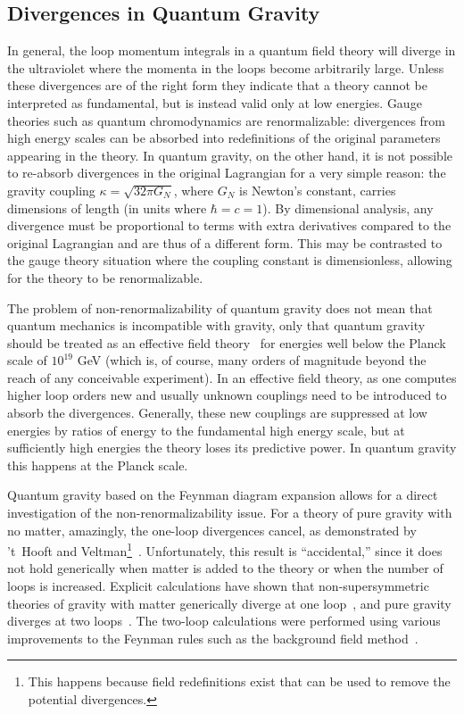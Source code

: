 \documentclass[12pt]{livrev}
\begin{document}
\subsection{Divergences in Quantum Gravity}

In general, the loop momentum integrals in a quantum field theory will
diverge in the ultraviolet where the momenta in the loops become
arbitrarily large.  Unless these divergences are of the right form
they indicate that a theory cannot be interpreted as 
fundamental, but is instead valid only at low energies.  Gauge
theories such as quantum chromodynamics are renormalizable:
divergences from high energy scales can be absorbed into redefinitions
of the original parameters appearing in the theory. In quantum gravity,
on the other hand, it is not possible to re-absorb divergences in the
original Lagrangian for a very simple reason: the gravity coupling $
\kappa = \sqrt{32 \pi G_N}$, where $G_N$ is Newton's constant, carries
dimensions of length (in units where $\hbar = c = 1$). By dimensional 
analysis, any divergence must be proportional to terms with extra
derivatives compared to the original Lagrangian and are thus of a
different form.  This may be contrasted to the gauge theory situation
where the coupling constant is dimensionless, allowing for the theory
to be renormalizable.

The problem of non-renormalizability of quantum gravity does not mean
that quantum mechanics is incompatible with gravity, only that quantum
gravity should be treated as an effective field
theory~\cite{Weinberg79,Gasser85,Donoghue94,Kaplan95,Manohar96} for
energies well below the Planck scale of $10^{19}$ GeV (which is, of
course, many orders of magnitude beyond the reach of any conceivable
experiment).  In an effective field theory, as one computes higher loop
orders new and usually unknown couplings need to be introduced to
absorb the divergences.  Generally, these new couplings are suppressed
at low energies by ratios of energy to the fundamental high energy
scale, but at sufficiently high energies the theory loses its
predictive power.  In quantum gravity this happens at the Planck
scale.

Quantum gravity based on the Feynman diagram expansion allows for a
direct investigation of the non-renormalizability issue.  For a theory
of pure gravity with no matter, amazingly, the one-loop divergences
cancel, as demonstrated by 't~Hooft and Veltman\footnote{This happens
because field redefinitions exist that can be used to remove the
potential divergences.}~\cite{tHooftVeltmanAnnPoin}. Unfortunately,
this result is ``accidental,'' since it does not hold generically when
matter is added to the theory or when the number of loops is
increased.  Explicit calculations have shown that
non-supersymmetric theories of gravity with matter generically diverge
at one loop~\cite{tHooftVeltmanAnnPoin,Deser74,DeserTsao74}, and pure
gravity diverges at two loops~\cite{Goroff86,vandeVen92}.  The
two-loop calculations were performed using various improvements to the
Feynman rules such as the background field
method~\cite{tHooft75,DeWitt81,Background}.  
\end{document}

